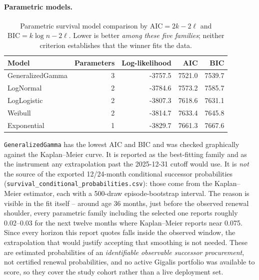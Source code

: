 \documentclass[11pt,a4paper]{article}
\newcommand{\code}[1]{\texttt{#1}}
\newcommand{\pathcode}[1]{\texttt{\small #1}}
\begin{document}
\paragraph{Parametric models.}
\begin{table}[H]
\centering
\small
\begin{tabularx}{\textwidth}{lrrrr}
\toprule
Model & Parameters & Log-likelihood & AIC & BIC \\
\midrule
GeneralizedGamma & 3 & -3757.5 & 7521.0 & 7539.7 \\
LogNormal & 2 & -3784.6 & 7573.2 & 7585.7 \\
LogLogistic & 2 & -3807.3 & 7618.6 & 7631.1 \\
Weibull & 2 & -3814.7 & 7633.4 & 7645.8 \\
Exponential & 1 & -3829.7 & 7661.3 & 7667.6 \\
\bottomrule
\end{tabularx}
\caption{Parametric survival model comparison by \(\mathrm{AIC}=2k-2\ell\) and
\(\mathrm{BIC}=k\log n-2\ell\). Lower is better \emph{among these five
families}; neither criterion establishes that the winner fits the data.}
\end{table}
\code{GeneralizedGamma} has the lowest AIC
and BIC and was checked graphically against the Kaplan--Meier curve. It is
reported as the best-fitting family and as the instrument any extrapolation past
the 2025-12-31 cutoff would use. It is \emph{not} the source of the exported
12/24-month conditional successor probabilities
(\pathcode{survival\_conditional\_probabilities.csv}): those come from the
Kaplan--Meier estimator, each with a 500-draw episode-bootstrap interval. The
reason is visible in the fit itself -- around age 36 months, just before the
observed renewal shoulder, every parametric family including the selected one
reports roughly 0.02--0.03 for the next twelve months where Kaplan--Meier reports
near 0.075. Since every horizon this report quotes falls inside the observed
window, the extrapolation that would justify accepting that smoothing is not
needed. These are estimated probabilities of an \emph{identifiable observable
successor procurement}, not certified renewal probabilities, and no active
Gigalis portfolio was available to score, so they cover the study cohort rather
than a live deployment set.
\end{document}
